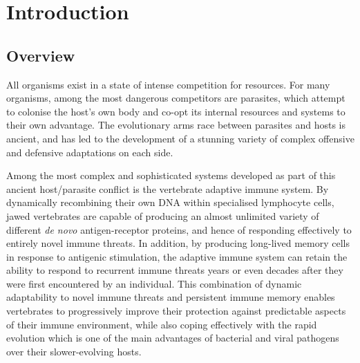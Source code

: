 
\chapter{Introduction}  %
\pagebreak
\onehalfspacing

\section{Overview}

All organisms exist in a state of intense competition for resources. For many organisms, among the most dangerous competitors are parasites, which attempt to colonise the host's own body and co-opt its internal resources and systems to their own advantage. The evolutionary arms race between parasites and hosts is ancient, and has led to the development of a stunning variety of complex offensive and defensive adaptations on each side. %

Among the most complex and sophisticated systems developed as part of this ancient host/parasite conflict is the vertebrate adaptive immune system. By dynamically recombining their own DNA within specialised lymphocyte cells, jawed vertebrates are capable of producing an almost unlimited variety of different \textit{de novo} antigen-receptor proteins, and hence of responding effectively to entirely novel immune threats. In addition, by producing long-lived memory cells in response to antigenic stimulation, the adaptive immune system can retain the ability to respond to recurrent immune threats years or even decades after they were first encountered by an individual. This combination of dynamic adaptability to novel immune threats and persistent immune memory enables vertebrates to progressively improve their protection against predictable aspects of their immune environment, while also coping effectively with the rapid evolution which is one of the main advantages of bacterial and viral pathogens over their slower-evolving hosts.

